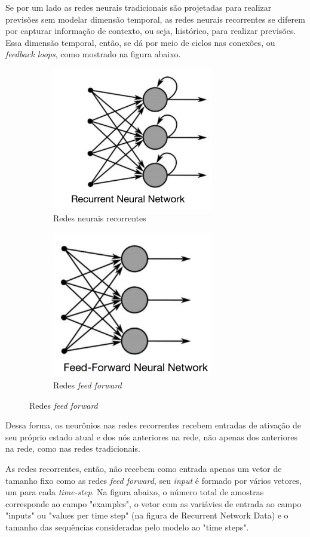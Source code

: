 Se por um lado as redes neurais tradicionais são projetadas
para realizar previsões sem modelar dimensão temporal, as redes
neurais recorrentes se diferem por capturar informação de contexto, ou seja,
histórico, para realizar previsões. Essa dimensão temporal, então, se dá por 
meio de ciclos nas conexões, ou \textit{feedback loops}, como mostrado na 
figura abaixo.


\begin{figure}[H]
  \centering
  \begin{subfigure}{7cm}
      \centering
      \includegraphics[width=7cm]{../figuras/redes/rnn.png}
      \caption{Redes neurais recorrentes}
  \end{subfigure}
  \hfill
  \begin{subfigure}{7cm}
      \centering
      \includegraphics[width=7cm]{../figuras/redes/ff.png}
      \caption{Redes \textit{feed forward}}
  \end{subfigure}
\end{figure}

Dessa forma, os neurônios nas redes recorrentes recebem entradas de ativação 
de seu próprio estado atual e dos nós anteriores na rede, não apenas dos anteriores
na rede, como nas redes tradicionais.

As redes recorrentes, então, não recebem como entrada apenas um vetor de tamanho 
fixo como as redes \textit{feed forward}, seu \textit{input} é formado 
por vários vetores, um para cada \textit{time-step}. Na figura abaixo, o número
total de amostras corresponde ao campo "examples", o vetor com as 
variávies de entrada ao campo "inputs" ou "values per time step" (na 
figura de Recurrent Network Data) e o tamanho das sequências consideradas
pelo modelo ao "time steps". 

